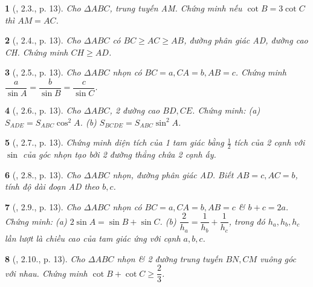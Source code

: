 \documentclass{article}
\newtheorem{baitoan}{}
\begin{document}
\begin{baitoan}[\cite{TLCT_THCS_Toan_9_hinh_hoc}, 2.3., p. 13]
	Cho $\Delta ABC$, trung tuyến AM. Chứng minh nếu $\cot B = 3\cot C$ thì $AM = AC$.
\end{baitoan}

\begin{baitoan}[\cite{TLCT_THCS_Toan_9_hinh_hoc}, 2.4., p. 13]
	Cho $\Delta ABC$ có $BC\ge AC\ge AB$, đường phân giác AD, đường cao CH. Chứng minh $CH\ge AD$.
\end{baitoan}

\begin{baitoan}[\cite{TLCT_THCS_Toan_9_hinh_hoc}, 2.5., p. 13]
	Cho $\Delta ABC$ nhọn có $BC = a,CA = b,AB = c$. Chứng minh $\dfrac{a}{\sin A} = \dfrac{b}{\sin B} = \dfrac{c}{\sin C}$.
\end{baitoan}

\begin{baitoan}[\cite{TLCT_THCS_Toan_9_hinh_hoc}, 2.6., p. 13]
	Cho $\Delta ABC$, 2 đường cao $BD,CE$. Chứng minh: (a) $S_{ADE} = S_{ABC}\cos^2A$. (b) $S_{BCDE} = S_{ABC}\sin^2A$.
\end{baitoan}

\begin{baitoan}[\cite{TLCT_THCS_Toan_9_hinh_hoc}, 2.7., p. 13]
	Chứng minh diện tích của 1 tam giác bằng $\frac{1}{2}$ tích của 2 cạnh với $\sin$ của góc nhọn tạo bởi 2 đường thẳng chứa 2 cạnh ấy.
\end{baitoan}

\begin{baitoan}[\cite{TLCT_THCS_Toan_9_hinh_hoc}, 2.8., p. 13]
	Cho $\Delta ABC$ nhọn, đường phân giác AD. Biết $AB = c,AC = b$, tính độ dài đoạn AD theo $b,c$.
\end{baitoan}

\begin{baitoan}[\cite{TLCT_THCS_Toan_9_hinh_hoc}, 2.9., p. 13]
	Cho $\Delta ABC$ nhọn có $BC = a,CA = b,AB = c$ \& $b + c = 2a$. Chứng minh: (a) $2\sin A = \sin B + \sin C$. (b) $\dfrac{2}{h_a} = \dfrac{1}{h_b} + \dfrac{1}{h_c}$, trong đó $h_a,h_b,h_c$ lần lượt là chiều cao của tam giác ứng với cạnh $a,b,c$.
\end{baitoan}

\begin{baitoan}[\cite{TLCT_THCS_Toan_9_hinh_hoc}, 2.10., p. 13]
	Cho $\Delta ABC$ nhọn \& 2 đường trung tuyến $BN,CM$ vuông góc với nhau. Chứng minh $\cot B + \cot C\ge\dfrac{2}{3}$.
\end{baitoan}
\end{document}

